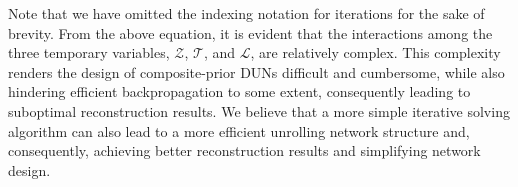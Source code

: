 Note that we have omitted the indexing notation for iterations for the sake of brevity. 
From the above equation, it is evident that the interactions among the three temporary variables, $\mathcal{Z}$, $\mathcal{T}$, and $\mathcal{L}$, are relatively complex. This complexity renders the design of composite-prior DUNs difficult and cumbersome, while also hindering efficient backpropagation to some extent, consequently leading to suboptimal reconstruction results. We believe that a more simple iterative solving algorithm can also lead to a more efficient unrolling network structure and, consequently, achieving better reconstruction results and simplifying network design.